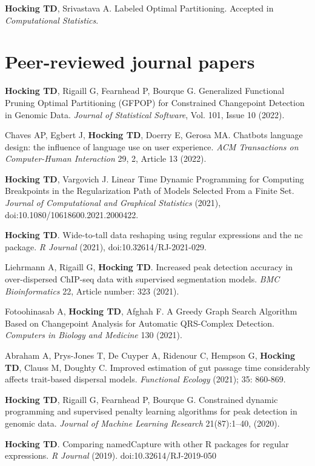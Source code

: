 \documentclass[margin,line]{res}
\begin{document}
\begin{resume}
{\bf Hocking TD}, Srivastava A. Labeled Optimal Partitioning. Accepted
in {\it Computational Statistics}.

\section{\sc Peer-reviewed journal papers}

{\bf Hocking TD}, Rigaill G, Fearnhead P, Bourque G. Generalized
Functional Pruning Optimal Partitioning (GFPOP) for Constrained
Changepoint Detection in Genomic Data. {\it Journal of Statistical
  Software}, Vol. 101, Issue 10 (2022).

Chaves AP, Egbert J, {\bf Hocking TD}, Doerry E, Gerosa MA. Chatbots
language design: the influence of language use on user
experience. {\it ACM Transactions on Computer-Human Interaction} 29,
2, Article 13 (2022).

{\bf Hocking TD}, Vargovich J. Linear Time Dynamic Programming for
Computing Breakpoints in the Regularization Path of Models Selected
From a Finite Set. {\it Journal of Computational and Graphical
  Statistics} (2021), doi:10.1080/10618600.2021.2000422.

{\bf Hocking TD}. Wide-to-tall data reshaping using regular
expressions and the nc package. {\it R Journal} (2021),
doi:10.32614/RJ-2021-029.

Liehrmann A, Rigaill G, {\bf Hocking TD}. Increased peak detection
accuracy in over-dispersed ChIP-seq data with supervised segmentation
models. {\it BMC Bioinformatics} 22, Article number: 323 (2021).

Fotoohinasab A, {\bf Hocking TD}, Afghah F. A Greedy Graph Search
Algorithm Based on Changepoint Analysis for Automatic QRS-Complex
Detection. {\it Computers in Biology and Medicine} 130 (2021).

Abraham A, Prys-Jones T, De Cuyper A, Ridenour C, Hempson G, {\bf
  Hocking TD}, Clauss M, Doughty C. Improved estimation of gut passage
time considerably affects trait-based dispersal models. {\it
  Functional Ecology} (2021); 35: 860-869.

{\bf Hocking TD}, Rigaill G, Fearnhead P, Bourque G. Constrained
dynamic programming and supervised penalty learning algorithms for
peak detection in genomic data. {\it Journal of Machine Learning
  Research} 21(87):1--40, (2020).

{\bf Hocking TD}. Comparing namedCapture with other R packages for
regular expressions. {\it R Journal} (2019). doi:10.32614/RJ-2019-050


\end{resume}
\end{document}
